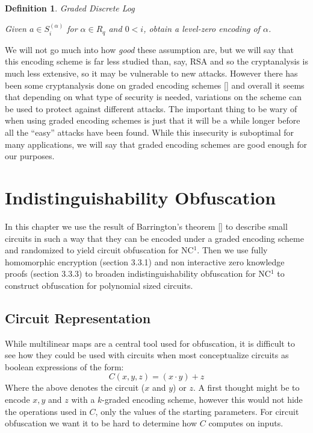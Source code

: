 \documentclass[12pt,twoside]{reedthesis}
\newtheorem{definition}{Definition}
\begin{document}
    \begin{definition}{Graded Discrete Log}
    \par Given $a\in S_i^{(\alpha)}$ for $\alpha \in R_q$ and $0<i$, obtain a level-zero encoding of $\alpha$.
    \end{definition}
    
    We will not go much into how \textit{good} these assumption are, but we will say that this encoding scheme is far less studied than, say, RSA and so the cryptanalysis is much less extensive, so it may be vulnerable to new attacks. However there has been some cryptanalysis done on graded encoding schemes [\cite{GGH13}] and overall it seems that depending on what type of security is needed, variations on the scheme can be used to protect against different attacks. The important thing to be wary of when using graded encoding schemes is just that it will be a while longer before all the ``easy'' attacks have been found. While this insecurity is suboptimal for many applications, we will say that graded encoding schemes are good enough for our purposes.
    
    
    
    
    
    \chapter{Indistinguishability Obfuscation}
    In this chapter we use the result of Barrington's theorem [\cite{Barrington:1986:BPB:12130.12131}] to describe small circuits in such a way that they can be encoded under a graded encoding scheme and randomized to yield circuit obfuscation for NC$^1$. Then we use fully homomorphic encryption (section 3.3.1) and non interactive zero knowledge proofs (section 3.3.3) to broaden indistinguishability obfuscation for NC$^1$ to construct obfuscation for polynomial sized circuits.
    
    
    \section{Circuit Representation}
    While multilinear maps are a central tool used for obfuscation, it is difficult to see how they could be used with circuits when most conceptualize circuits as boolean expressions of the form:
    $$C(x,y,z) = (x \cdot y) + z $$
    Where the above denotes the circuit ($x$ and $y$) or $z$. A first thought might be to encode $x,y$ and $z$ with a $k$-graded encoding scheme, however this would not hide the operations used in $C$, only the values of the starting parameters. For circuit obfuscation we want it to be hard to determine how $C$ computes on inputs.
    
\end{document}
